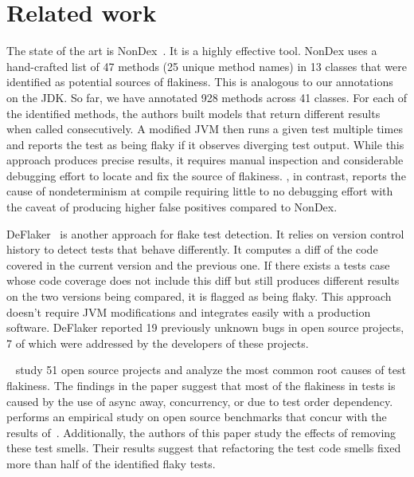 \section{Related work}\label{sec:related}


The state of the art is NonDex~\cite{nondex}.  It is a highly effective tool.
NonDex uses a hand-crafted list of 47 methods (25 unique method names)
in 13 classes that were identified as potential sources of flakiness. 
This is analogous to our annotations on the JDK\@. So far, we have annotated
928 methods across 41 classes.
For each of the identified methods, the authors built models that
return different results when called consecutively. A modified JVM then
runs a given test multiple times and reports the test as being flaky if it observes
diverging test output. While this approach produces precise results, it requires manual inspection
and considerable debugging effort to locate and fix the source of flakiness. \TheDeterminismChecker, in
contrast, reports the cause of nondeterminism at compile requiring little to no debugging effort with the
caveat of producing higher false positives compared to NonDex.

DeFlaker~\cite{deflaker} is another approach for flake test detection. It relies on
version control history to detect tests that behave differently. It computes a diff of the code covered
in the current version and the previous one. If there exists a tests case whose code coverage does not include
this diff but still produces different results on the two versions being compared, it is flagged as being flaky.
This approach doesn't require JVM modifications
and integrates easily with a production software. DeFlaker reported 19 previously unknown bugs
in open source projects, 7 of which were addressed by the developers of these projects.

~\cite{LuoHEM2014} study 51 open source projects and analyze the most common root causes of
test flakiness. The findings in the paper suggest that most of the flakiness in tests is caused by
the use of async away, concurrency, or due to test order dependency.~\cite{Plotkin:1993:LPP:645891.671433}
performs an empirical study on open source benchmarks that concur with the results of~\cite{LuoHEM2014}.
Additionally, the authors of this paper study the effects of removing these test smells. Their results suggest that
refactoring the test code smells fixed more than half of the identified flaky tests.

